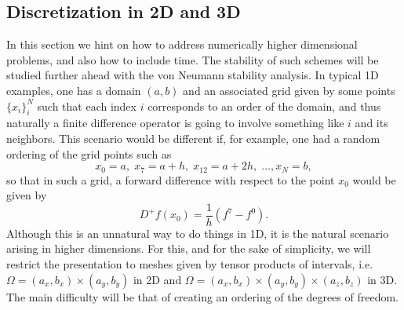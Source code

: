 \documentclass{article}
\begin{document}
\subsection{Discretization in 2D and 3D}
In this section we hint on how to address numerically higher dimensional problems, and also how to include time. The stability of such schemes will be studied further ahead with the von Neumann stability analysis. In typical 1D examples, one has a domain $(a,b)$ and an associated grid given by some points $\{x_i\}_i^N$ such that each index $i$ corresponds to an order of the domain, and thus naturally a finite difference operator is going to involve something like $i$ and its neighbors. This scenario would be different if, for example, one had a random ordering of the grid points such as
    $$ x_0 = a,\; x_7 = a + h,\; x_{12} = a + 2h,\; \hdots, x_N = b, $$
so that in such a grid, a forward difference with respect to the point $x_0$ would be given by
    $$ D^+f(x_0) = \frac 1 h \left( f^7 - f^0 \right). $$
Although this is an unnatural way to do things in 1D, it is the natural scenario arising in higher dimensions. For this, and for the sake of simplicity, we will restrict the presentation to meshes given by tensor products of intervals, i.e. $\Omega = (a_x, b_x) \times (a_y, b_y)$ in 2D and $\Omega = (a_x, b_x) \times (a_y, b_y) \times (a_z, b_z)$ in 3D. The main difficulty will be that of creating an ordering of the degrees of freedom.
\end{document}
